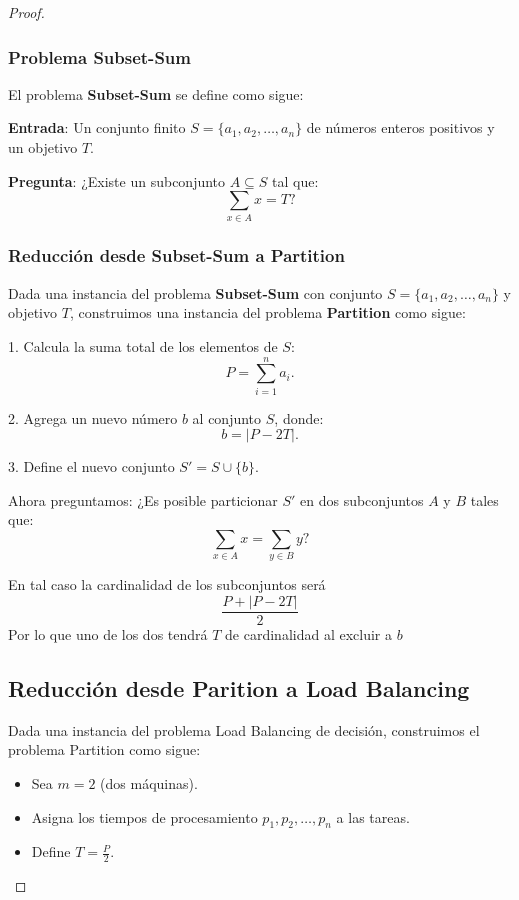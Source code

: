 \documentclass{report}
\begin{document}
\begin{proof}
	\subsubsection*{Problema Subset-Sum}
	
	El problema \textbf{Subset-Sum} se define como sigue:
	
	\textbf{Entrada}: Un conjunto finito $ S = \{a_1, a_2, \dots, a_n\} $ de números enteros positivos y un objetivo $ T $.
	
	\textbf{Pregunta}: ¿Existe un subconjunto $ A \subseteq S $ tal que:
	\[
	\sum_{x \in A} x = T?
	\]
	
	\subsubsection*{Reducción desde Subset-Sum a Partition}
	
	Dada una instancia del problema \textbf{Subset-Sum} con conjunto $ S = \{a_1, a_2, \dots, a_n\} $ y objetivo $ T $, construimos una instancia del problema \textbf{Partition} como sigue:
	
	1. Calcula la suma total de los elementos de $ S $:
	\[
	P = \sum_{i=1}^n a_i.
	\]
	
	2. Agrega un nuevo número $ b $ al conjunto $ S $, donde:
	\[
	b = |P - 2T|.
	\]
	
	3. Define el nuevo conjunto $ S' = S \cup \{b\} $.
	
	Ahora preguntamos: ¿Es posible particionar $ S' $ en dos subconjuntos $ A $ y $ B $ tales que:
	\[
	\sum_{x \in A} x = \sum_{y \in B} y?
	\]
	
	En tal caso la cardinalidad de los subconjuntos será $$\frac{P + |P - 2T|}{2}$$ Por lo que uno de los dos tendrá $T$ de cardinalidad al excluir a $b$
	
	
	
	
	\subsection*{Reducción desde Parition a Load Balancing}
	Dada una instancia del problema Load Balancing de decisión, construimos el problema Partition como sigue:
	\begin{itemize}
		\item Sea $ m = 2 $ (dos máquinas).
		\item Asigna los tiempos de procesamiento $ p_1, p_2, \dots, p_n $ a las tareas.
		\item Define $ T = \frac{P}{2} $.
	\end{itemize}
	

\end{proof}
\end{document}
